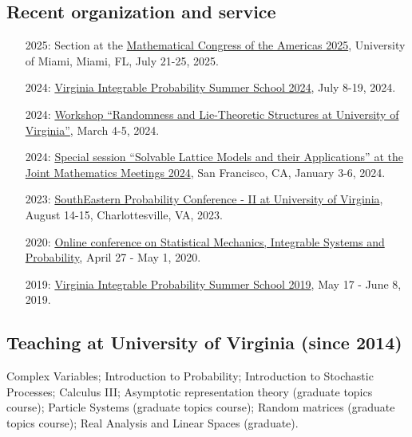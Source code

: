 \documentclass[letterpaper,11pt]{article}
\begin{document}
\subsection*{Recent organization and service}

\begin{itemize}
	\item [2025:] 
	Section at the
	\href{https://www.math.miami.edu/mca/}{Mathematical Congress of the Americas 2025},
	University of Miami,
	Miami, FL,
	July 21-25, 2025.

	\item [2024:] 
	\href{https://lpetrov.cc/vipss2024/}{Virginia Integrable Probability Summer School 2024},
	July 8-19, 2024.

	\item [2024:] 
	\href{https://math.virginia.edu/random-lie-2024/}{Workshop ``Randomness and Lie-Theoretic Structures at University of Virginia''},
	March 4-5, 2024.

	\item [2024:] 
\href{https://www.jointmathematicsmeetings.org/meetings/national/jmm2024/2300_program_ss43.html}{Special session ``Solvable Lattice Models and their Applications'' at the Joint Mathematics Meetings 2024},
San Francisco, CA, January 3-6, 2024.

\item [2023:] 
\href{https://sites.google.com/view/sepc2023ii/sepc-2023-ii}{SouthEastern Probability Conference - II at University of Virginia},
August 14-15, Charlottesville, VA, 2023.

\item [2020:]
\href{http://mtikhonov.com/smisp/}{Online conference on Statistical Mechanics, Integrable Systems and Probability},
April 27 - May 1, 2020.

\item [2019:]
\href{http://vipss.int-prob.org/}{Virginia Integrable Probability Summer School 2019},
May 17 - June 8, 2019.

\end{itemize}


\subsection*{Teaching at University of Virginia (since 2014)}

Complex Variables;
Introduction to Probability; 
Introduction to Stochastic Processes;
Calculus III;
Asymptotic representation theory (graduate topics course);
Particle Systems (graduate topics course);
Random matrices (graduate topics course);
Real Analysis and Linear Spaces (graduate).
\end{document}
